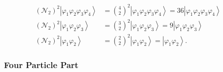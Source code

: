 \documentclass[aps,preprint]{revtex4}%
\begin{document}
\begin{align*}
\left(  \mathcal{N}_{2}\right)  ^{2}\left\vert \varphi_{1}\varphi_{2}%
\varphi_{3}\varphi_{4}\right\rangle  &  =\binom{4}{2}^{2}\left\vert
\varphi_{1}\varphi_{2}\varphi_{3}\varphi_{4}\right\rangle =36\left\vert
\varphi_{1}\varphi_{2}\varphi_{3}\varphi_{4}\right\rangle \\
\left(  \mathcal{N}_{2}\right)  ^{2}\left\vert \varphi_{1}\varphi_{2}%
\varphi_{3}\right\rangle  &  =\binom{3}{2}^{2}\left\vert \varphi_{1}%
\varphi_{2}\varphi_{3}\right\rangle =9\left\vert \varphi_{1}\varphi_{2}%
\varphi_{3}\right\rangle \\
\left(  \mathcal{N}_{2}\right)  ^{2}\left\vert \varphi_{1}\varphi
_{2}\right\rangle  &  =\binom{2}{2}^{2}\left\vert \varphi_{1}\varphi
_{2}\right\rangle =\left\vert \varphi_{1}\varphi_{2}\right\rangle .
\end{align*}


\subsubsection{Four Particle Part}
\end{document}
